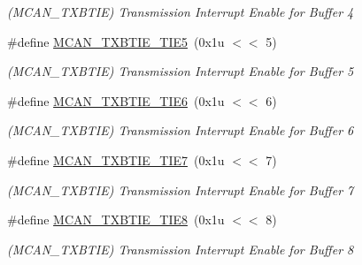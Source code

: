\begin{DoxyCompactItemize}
\begin{DoxyCompactList}\small\item\em (M\+C\+A\+N\+\_\+\+T\+X\+B\+T\+IE) Transmission Interrupt Enable for Buffer 4 \end{DoxyCompactList}\item 
\mbox{\label{group__SAME70__MCAN_ga8ea91615985e6935395da670f5a9d8a8}} 
\#define \mbox{\hyperlink{group__SAME70__MCAN_ga8ea91615985e6935395da670f5a9d8a8}{M\+C\+A\+N\+\_\+\+T\+X\+B\+T\+I\+E\+\_\+\+T\+I\+E5}}~(0x1u $<$$<$ 5)
\begin{DoxyCompactList}\small\item\em (M\+C\+A\+N\+\_\+\+T\+X\+B\+T\+IE) Transmission Interrupt Enable for Buffer 5 \end{DoxyCompactList}\item 
\mbox{\label{group__SAME70__MCAN_ga0ab6cd89ac8133b2648ff5079c2843cf}} 
\#define \mbox{\hyperlink{group__SAME70__MCAN_ga0ab6cd89ac8133b2648ff5079c2843cf}{M\+C\+A\+N\+\_\+\+T\+X\+B\+T\+I\+E\+\_\+\+T\+I\+E6}}~(0x1u $<$$<$ 6)
\begin{DoxyCompactList}\small\item\em (M\+C\+A\+N\+\_\+\+T\+X\+B\+T\+IE) Transmission Interrupt Enable for Buffer 6 \end{DoxyCompactList}\item 
\mbox{\label{group__SAME70__MCAN_gae33cdab629fed6029a94e25e1a93b64a}} 
\#define \mbox{\hyperlink{group__SAME70__MCAN_gae33cdab629fed6029a94e25e1a93b64a}{M\+C\+A\+N\+\_\+\+T\+X\+B\+T\+I\+E\+\_\+\+T\+I\+E7}}~(0x1u $<$$<$ 7)
\begin{DoxyCompactList}\small\item\em (M\+C\+A\+N\+\_\+\+T\+X\+B\+T\+IE) Transmission Interrupt Enable for Buffer 7 \end{DoxyCompactList}\item 
\mbox{\label{group__SAME70__MCAN_ga27f7b0cf10de9b2e8b60f095c7847dcf}} 
\#define \mbox{\hyperlink{group__SAME70__MCAN_ga27f7b0cf10de9b2e8b60f095c7847dcf}{M\+C\+A\+N\+\_\+\+T\+X\+B\+T\+I\+E\+\_\+\+T\+I\+E8}}~(0x1u $<$$<$ 8)
\begin{DoxyCompactList}\small\item\em (M\+C\+A\+N\+\_\+\+T\+X\+B\+T\+IE) Transmission Interrupt Enable for Buffer 8 \end{DoxyCompactList}\item 

\end{DoxyCompactItemize}
